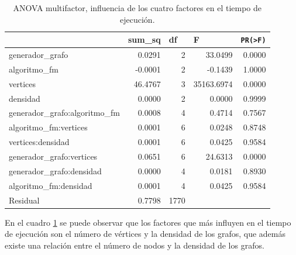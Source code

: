\documentclass{article}
\begin{document}
\begin{table}[htbp]
  \centering
  \caption{ANOVA multifactor, influencia de los cuatro factores en el tiempo de ejecución.}
    \begin{tabular}{lrrrr}
    \toprule
          & \multicolumn{1}{l}{\textbf{sum\_sq}} & \multicolumn{1}{l}{\textbf{df}} & \multicolumn{1}{l}{\textbf{F}} & \multicolumn{1}{l}{\textbf{\texttt{PR(>F)}}} \\
    \midrule
    generador\_grafo & 0.0291 & 2     & 33.0499 & 0.0000 \\
    algoritmo\_fm & -0.0001 & 2     & -0.1439 & 1.0000 \\
    vertices & 46.4767 & 3     & 35163.6974 & 0.0000 \\
    densidad & 0.0000 & 2     & 0.0000 & 0.9999 \\
    generador\_grafo:algoritmo\_fm & 0.0008 & 4     & 0.4714 & 0.7567 \\
    algoritmo\_fm:vertices & 0.0001 & 6     & 0.0248 & 0.8748 \\
    vertices:densidad & 0.0001 & 6     & 0.0425 & 0.9584 \\
    generador\_grafo:vertices & 0.0651 & 6     & 24.6313 & 0.0000 \\
    generador\_grafo:densidad & 0.0000 & 4     & 0.0181 & 0.8930 \\
    algoritmo\_fm:densidad & 0.0001 & 4     & 0.0425 & 0.9584 \\
    Residual & 0.7798 & 1770  &       &  \\
    \bottomrule
    \end{tabular}%
  \label{tab:t7}%
\end{table}%
En el cuadro \ref{tab:t7} se puede observar que los factores que más influyen en el tiempo de ejecución son el número de vértices y la densidad de los grafos, que además existe una relación entre el número de nodos y la densidad de los grafos. 

\newpage


\end{document}
